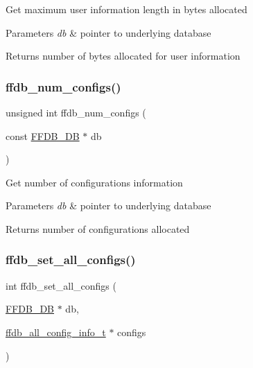 Get maximum user information length in bytes allocated


\begin{DoxyParams}{Parameters}
{\em db} & pointer to underlying database \\
\hline
\end{DoxyParams}
\begin{DoxyReturn}{Returns}
number of bytes allocated for user information 
\end{DoxyReturn}
\mbox{\label{adat-devel_2other__libs_2filedb_2filehash_2ffdb__hash_8c_aa3722865ae0e52878e2fc443f4f1a0a8}} 
\subsubsection{\texorpdfstring{ffdb\_num\_configs()}{ffdb\_num\_configs()}}
{\footnotesize\ttfamily unsigned int ffdb\+\_\+num\+\_\+configs (\begin{DoxyParamCaption}\item[{const \mbox{\hyperlink{adat-devel_2other__libs_2filedb_2filehash_2ffdb__db_8h_a0b27b956926453a7a8141ea8e10f0df8}{F\+F\+D\+B\+\_\+\+DB}} $\ast$}]{db }\end{DoxyParamCaption})}

Get number of configurations information


\begin{DoxyParams}{Parameters}
{\em db} & pointer to underlying database\\
\hline
\end{DoxyParams}
\begin{DoxyReturn}{Returns}
number of configurations allocated 
\end{DoxyReturn}
\mbox{\label{adat-devel_2other__libs_2filedb_2filehash_2ffdb__hash_8c_a025a0fd1b0b76b024679498011af4bc3}} 
\subsubsection{\texorpdfstring{ffdb\_set\_all\_configs()}{ffdb\_set\_all\_configs()}}
{\footnotesize\ttfamily int ffdb\+\_\+set\+\_\+all\+\_\+configs (\begin{DoxyParamCaption}\item[{\mbox{\hyperlink{adat-devel_2other__libs_2filedb_2filehash_2ffdb__db_8h_a0b27b956926453a7a8141ea8e10f0df8}{F\+F\+D\+B\+\_\+\+DB}} $\ast$}]{db,  }\item[{\mbox{\hyperlink{adat-devel_2other__libs_2filedb_2filehash_2ffdb__db_8h_afc17234e7cd387e11de55b92df6bb0e5}{ffdb\+\_\+all\+\_\+config\+\_\+info\+\_\+t}} $\ast$}]{configs }\end{DoxyParamCaption})}

